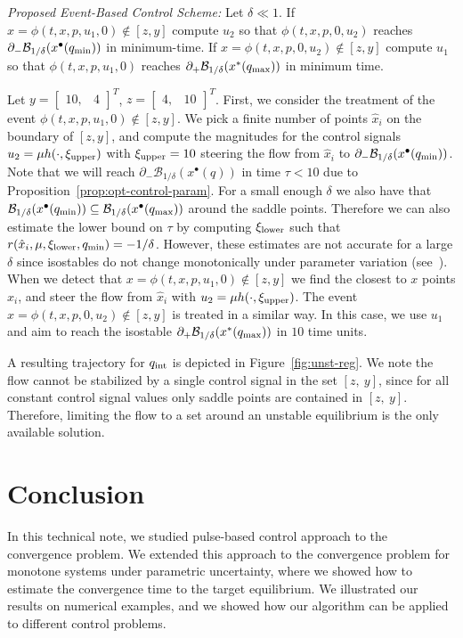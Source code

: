 \documentclass[letterpaper, 10pt, journal]{IEEEtran}  %
\newcommand{\cB}{{\mathcal B}}
\begin{document}
\emph{Proposed Event-Based Control Scheme:} Let $\delta \ll 1$. If $x = \phi(t, x, p, u_1, 0)\not \in[z, y]$ compute $u_2$ so that $\phi(t, x, p, 0, u_2)$ reaches $\partial_-\cB_{1/\delta}(x^\bullet(q_{\rm min}))$ in minimum-time. If $x = \phi(t, x, p, 0, u_2)\not \in[z, y]$ compute $u_1$ so that $\phi(t, x, p, u_1, 0)$ reaches $\partial_+\cB_{1/\delta}(x^\ast(q_{\rm max}))$ in minimum time. 

Let $y = \begin{bmatrix}
10, & 4
\end{bmatrix}^T$, $z = \begin{bmatrix}
4, & 10
\end{bmatrix}^T$. First, we consider the treatment of the event $\phi(t, x, p, u_1, 0)\not \in[z, y]$. We pick a finite number of points $\hat x_i$ on the boundary of $[z, y]$, and compute the magnitudes for the control signals $u_2 = \mu h(\cdot, \xi_{\rm upper})$ with $\xi_{\rm upper} = 10$ steering the flow from $\hat x_i$ to $\partial_-\cB_{1/\delta}(x^\bullet(q_{\rm min}))$. Note that we will reach $\partial_-\cB_{1/\delta}(x^\bullet(q))$ in time $\tau < 10$ due to Proposition~\ref{prop:opt-control-param}. For a small enough $\delta$ we also have that  $\cB_{1/\delta}(x^\bullet(q_{\rm min})) \subseteq \cB_{1/\delta}(x^\bullet(q_{\rm max}))$ around the saddle points. Therefore we can also estimate the lower bound on $\tau$ by computing $\xi_{\rm lower}$ such that $r(\hat x_i, \mu, \xi_{\rm lower},q_{\rm min}) = -1/\delta$. However, these estimates are not accurate for a large $\delta$ since isostables do not change monotonically under parameter variation (see~\cite{sootla2016basins}). When we detect that $x=\phi(t, x, p, u_1, 0)\not \in [z,y]$ we find the closest to $x$ points $\hat x_i$, and steer the flow from $\hat x_i$ with $u_2 = \mu h(\cdot, \xi_{\rm upper})$. The event $x = \phi(t, x, p, 0, u_2)\not \in[z, y]$ is treated in a similar way. In this case, we use $u_1$ and aim to reach the isostable $\partial_+\cB_{1/\delta}(x^\ast(q_{\rm max}))$ in $10$ time units. 

A resulting trajectory for $q_{\rm int}$ is depicted in Figure~\ref{fig:unst-reg}. We note the flow cannot be stabilized by a single control signal in the set $[z,~y]$, since for all constant control signal values only saddle points are contained in $[z,~y]$. Therefore, limiting the flow to a set around an unstable equilibrium is the only available solution. 

 

\section{Conclusion}
In this technical note, we studied pulse-based control approach to the convergence problem. We extended this approach to the convergence problem for monotone systems under parametric uncertainty, where we showed how to estimate the convergence time to the target equilibrium. We illustrated our results on numerical examples, and we showed how our algorithm can be applied to different control problems. 
\end{document}
